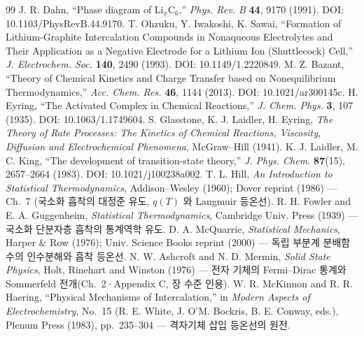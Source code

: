 \begin{thebibliography}{99}
 J. R. Dahn, ``Phase diagram of Li$_x$C$_6$,'' \emph{Phys. Rev. B} \textbf{44}, 9170 (1991). DOI: 10.1103/PhysRevB.44.9170.
 T. Ohzuku, Y. Iwakoshi, K. Sawai, ``Formation of Lithium-Graphite Intercalation Compounds in Nonaqueous Electrolytes and Their Application as a Negative Electrode for a Lithium Ion (Shuttlecock) Cell,'' \emph{J. Electrochem. Soc.} \textbf{140}, 2490 (1993). DOI: 10.1149/1.2220849.
 M. Z. Bazant, ``Theory of Chemical Kinetics and Charge Transfer based on Nonequilibrium Thermodynamics,'' \emph{Acc. Chem. Res.} \textbf{46}, 1144 (2013). DOI: 10.1021/ar300145c.
 H. Eyring, ``The Activated Complex in Chemical Reactions,'' \emph{J. Chem. Phys.} \textbf{3}, 107 (1935). DOI: 10.1063/1.1749604.
 S. Glasstone, K. J. Laidler, H. Eyring, \emph{The Theory of Rate Processes: The Kinetics of Chemical Reactions, Viscosity, Diffusion and Electrochemical Phenomena}, McGraw--Hill (1941).
 K. J. Laidler, M. C. King, ``The development of transition-state theory,'' \emph{J. Phys. Chem.} \textbf{87}(15), 2657--2664 (1983). DOI: 10.1021/j100238a002.
 T. L. Hill, \emph{An Introduction to Statistical Thermodynamics}, Addison--Wesley (1960); Dover reprint (1986) --- Ch.~7 (국소화 흡착의 대정준 유도, $q(T)$ 와 Langmuir 등온선).
 R. H. Fowler and E. A. Guggenheim, \emph{Statistical Thermodynamics}, Cambridge Univ. Press (1939) --- 국소화 단분자층 흡착의 통계역학 유도.
 D. A. McQuarrie, \emph{Statistical Mechanics}, Harper \& Row (1976); Univ. Science Books reprint (2000) --- 독립 부분계 분배함수의 인수분해와 흡착 등온선.
 N. W. Ashcroft and N. D. Mermin, \emph{Solid State Physics}, Holt, Rinehart and Winston (1976) --- 전자 기체의 Fermi--Dirac 통계와 Sommerfeld 전개(Ch.~2·Appendix C, 장 수준 인용).
 W. R. McKinnon and R. R. Haering, ``Physical Mechanisms of Intercalation,'' in \emph{Modern Aspects of Electrochemistry}, No.~15 (R. E. White, J. O'M. Bockris, B. E. Conway, eds.), Plenum Press (1983), pp.~235--304 --- 격자기체 삽입 등온선의 원전.

\end{thebibliography}
